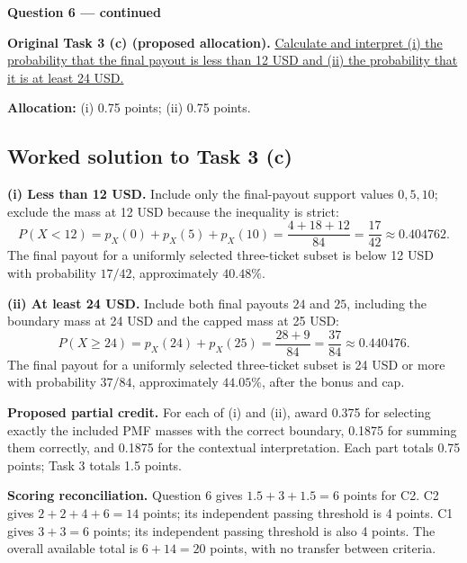 \par\vspace{3mm}\secInicio[][sec:q6]

\clearpage
\textbf{Question 6 --- continued}

\textbf{Original Task 3 (c) (proposed allocation).} \hyperref[sol:q6t3]{Calculate and interpret (i) the probability that the final payout is less than 12 USD and (ii) the probability that it is at least 24 USD.} 

\textbf{Allocation:} (i) 0.75 points; (ii) 0.75 points.

\subsection*{Worked solution to Task 3 (c) }
\label{sol:q6t3}

\textbf{(i) Less than 12 USD.} Include only the final-payout support values $0,5,10$; exclude the mass at 12 USD because the inequality is strict:
\[
P(X<12)=p_X(0)+p_X(5)+p_X(10)
=\frac{4+18+12}{84}=\frac{17}{42}\approx0.404762.
\]
The final payout for a uniformly selected three-ticket subset is below 12 USD with probability $17/42$, approximately $40.48\%$.

\textbf{(ii) At least 24 USD.} Include both final payouts $24$ and $25$, including the boundary mass at 24 USD and the capped mass at 25 USD:
\[
P(X\geq24)=p_X(24)+p_X(25)
=\frac{28+9}{84}=\frac{37}{84}\approx0.440476.
\]
The final payout for a uniformly selected three-ticket subset is 24 USD or more with probability $37/84$, approximately $44.05\%$, after the bonus and cap.

\textbf{Proposed partial credit.} For each of (i) and (ii), award 0.375 for selecting exactly the included PMF masses with the correct boundary, 0.1875 for summing them correctly, and 0.1875 for the contextual interpretation. Each part totals 0.75 points; Task 3 totals 1.5 points.

\par\vspace{3mm}\secInicio[][sec:q6]

\textbf{Scoring reconciliation.} Question 6 gives $1.5+3+1.5=6$ points for C2. C2 gives $2+2+4+6=14$ points; its independent passing threshold is 4 points. C1 gives $3+3=6$ points; its independent passing threshold is also 4 points. The overall available total is $6+14=20$ points, with no transfer between criteria.


